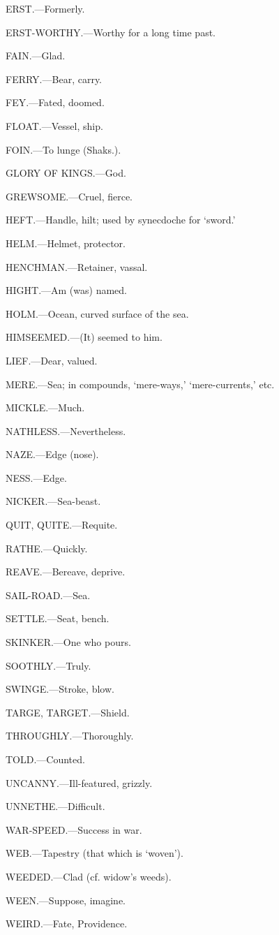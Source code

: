 ERST.—Formerly.

ERST-WORTHY.—Worthy for a long time past.

FAIN.—Glad.

FERRY.—Bear, carry.

FEY.—Fated, doomed.

FLOAT.—Vessel, ship.

FOIN.—To lunge (Shaks.).

GLORY OF KINGS.—God.

GREWSOME.—Cruel, fierce.

HEFT.—Handle, hilt; used by synecdoche for ‘sword.’

HELM.—Helmet, protector.

HENCHMAN.—Retainer, vassal.

HIGHT.—Am (was) named.

HOLM.—Ocean, curved surface of the sea.

HIMSEEMED.—(It) seemed to him.

LIEF.—Dear, valued.

MERE.—Sea; in compounds, ‘mere-ways,’ ‘mere-currents,’ etc.

MICKLE.—Much.

NATHLESS.—Nevertheless.

NAZE.—Edge (nose).

NESS.—Edge.

NICKER.—Sea-beast.

QUIT, QUITE.—Requite.

RATHE.—Quickly.

REAVE.—Bereave, deprive.

SAIL-ROAD.—Sea.

SETTLE.—Seat, bench.

SKINKER.—One who pours.

SOOTHLY.—Truly.

SWINGE.—Stroke, blow.

TARGE, TARGET.—Shield.

THROUGHLY.—Thoroughly.

TOLD.—Counted.

UNCANNY.—Ill-featured, grizzly.

UNNETHE.—Difficult.

WAR-SPEED.—Success in war.

WEB.—Tapestry (that which is ‘woven’).

WEEDED.—Clad (cf. widow’s weeds).

WEEN.—Suppose, imagine.

WEIRD.—Fate, Providence.

